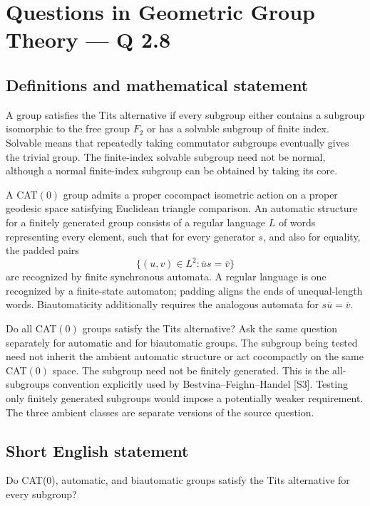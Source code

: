 \documentclass[11pt,a4paper]{article}
\begin{document}
\section*{Questions in Geometric Group Theory — Q 2.8}\label{statement}

\subsection{Definitions and mathematical statement}
A group satisfies the Tits alternative if every subgroup either contains a subgroup isomorphic to the free group $F_2$ or has a solvable subgroup of finite index. Solvable means that repeatedly taking commutator subgroups eventually gives the trivial group. The finite-index solvable subgroup need not be normal, although a normal finite-index subgroup can be obtained by taking its core.

A CAT$(0)$ group admits a proper cocompact isometric action on a proper geodesic space satisfying Euclidean triangle comparison. An automatic structure for a finitely generated group consists of a regular language $L$ of words representing every element, such that for every generator $s$, and also for equality, the padded pairs
\[
 \{(u,v)\in L^2:\overline u s=\overline v\}
\]
are recognized by finite synchronous automata. A regular language is one recognized by a finite-state automaton; padding aligns the ends of unequal-length words. Biautomaticity additionally requires the analogous automata for $s\overline u=\overline v$.

Do all CAT$(0)$ groups satisfy the Tits alternative? Ask the same question separately for automatic and for biautomatic groups. The subgroup being tested need not inherit the ambient automatic structure or act cocompactly on the same CAT$(0)$ space. The subgroup need not be finitely generated. This is the all-subgroups convention explicitly used by Bestvina--Feighn--Handel [S3]. Testing only finitely generated subgroups would impose a potentially weaker requirement. The three ambient classes are separate versions of the source question.
\subsection{Short English statement}
Do CAT(0), automatic, and biautomatic groups satisfy the Tits alternative for every subgroup?
\end{document}
